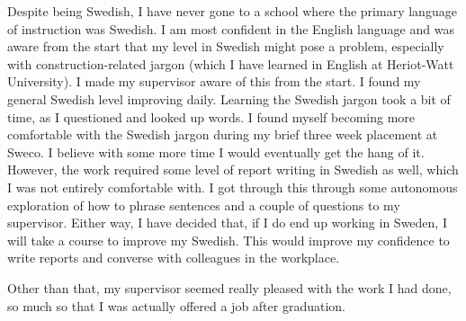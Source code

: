 
Despite being Swedish, I have never gone to a school where the primary language of instruction was Swedish.
I am most confident in the English language and was aware from the start that my level in Swedish might pose a problem, especially with construction-related jargon (which I have learned in English at Heriot-Watt University).
I made my supervisor aware of this from the start.
I found my general Swedish level improving daily.
Learning the Swedish jargon took a bit of time, as I questioned and looked up words.
I found myself becoming more comfortable with the Swedish jargon during my brief three week placement at Sweco.
I believe with some more time I would eventually get the hang of it.
However, the work required some level of report writing in Swedish as well, which I was not entirely comfortable with.
I got through this through some autonomous exploration of how to phrase sentences and a couple of questions to my supervisor.
Either way, I have decided that, if I do end up working in Sweden, I will take a course to improve my Swedish.
This would improve my confidence to write reports and converse with colleagues in the workplace.

Other than that, my supervisor seemed really pleased with the work I had done, so much so that I was actually offered a job after graduation.
